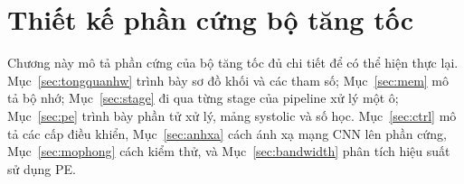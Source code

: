 \chapter{Thiết kế phần cứng bộ tăng tốc}\label{ch:phancung}

Chương này mô tả phần cứng của bộ tăng tốc đủ chi tiết để có thể hiện thực lại.
Mục~\ref{sec:tongquanhw} trình bày sơ đồ khối và các tham số; Mục~\ref{sec:mem} mô tả bộ nhớ; Mục~\ref{sec:stage} đi qua từng stage của pipeline xử lý một ô; Mục~\ref{sec:pe} trình bày phần tử xử lý, mảng systolic và số học.
Mục~\ref{sec:ctrl} mô tả các cấp điều khiển, Mục~\ref{sec:anhxa} cách ánh xạ mạng CNN lên phần cứng, Mục~\ref{sec:mophong} cách kiểm thử, và Mục~\ref{sec:bandwidth} phân tích hiệu suất sử dụng PE.









